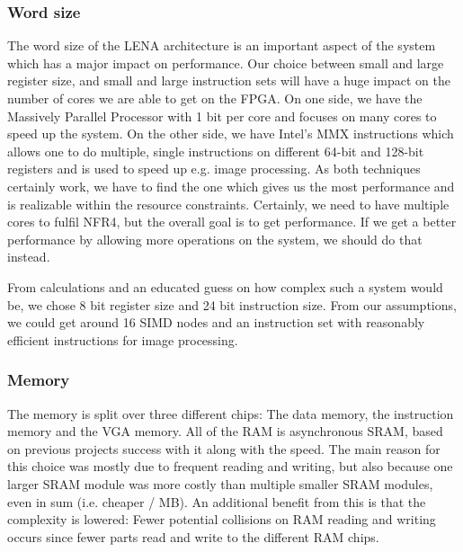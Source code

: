 \subsubsection{Word size}

The word size of the \ac{LENA} architecture is an important aspect of the system which
has a major impact on performance. Our choice between small and large
register size, and
small and large instruction sets will have a huge impact on the number of cores
we are able to get on the \ac{FPGA}. On one side, we have the Massively Parallel
Processor\cite{potter1985mpp} with 1 bit per core and focuses on many cores to
speed up the system. On the other side, we have Intel's MMX instructions which
allows one to do multiple, single instructions on different 64-bit and 128-bit
registers and is used to speed up e.g. image processing\cite{lee2004h264}. As
both techniques certainly work, we have to find the one which gives us the most
performance and is realizable within the resource constraints. Certainly, we
need to have multiple cores to fulfil NFR4, but the overall goal is to get
performance. If we get a better performance by allowing more operations on the
system, we should do that instead.

From calculations and an educated guess
on how complex such a system would be, we chose 8 bit register size and 24 bit instruction
size. From our assumptions, we could get around 16 \ac{SIMD} nodes and an
instruction set with reasonably efficient instructions for image processing.

\subsubsection{Memory}

The memory is split over three different chips: The data memory, the instruction
memory and the \ac{VGA} memory. All of the \ac{RAM} is asynchronous \ac{SRAM},
based on previous projects success with it\cite{berg2011festinalente} along with
the speed. The main reason for this choice was mostly due to frequent reading
and writing, but also because one larger \ac{SRAM} module was more costly than
multiple smaller \ac{SRAM} modules, even in sum (i.e. cheaper / MB). An
additional benefit from this is that the complexity is lowered: Fewer potential
collisions on \ac{RAM} reading and writing occurs since fewer parts read and
write to the different \ac{RAM} chips.

